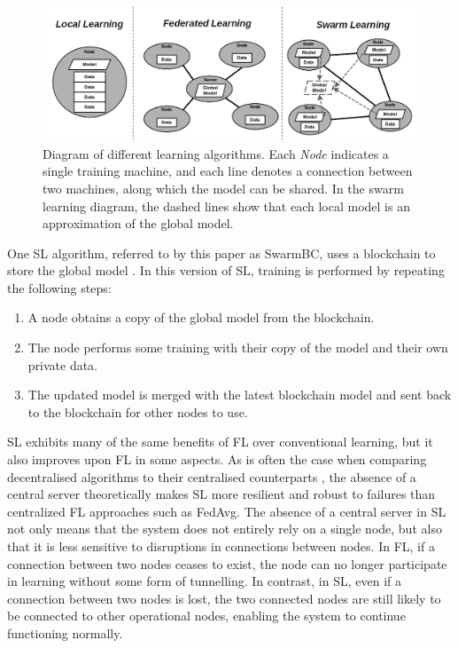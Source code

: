 \documentclass[letterpaper, 10 pt, conference]{ieeeconf}  %
\begin{document}
\begin{figure}[h]
	\includegraphics[width=\linewidth]{fedvsswarm}
	\caption{Diagram of different learning algorithms. Each \emph{Node} indicates a single training machine, and each line denotes a connection between two machines, along which the model can be shared. In the swarm learning diagram, the dashed lines show that each local model is an approximation of the global model.} \label{fig_learning}
\end{figure}

One SL algorithm, referred to by this paper as SwarmBC, uses a blockchain to store the global model \cite{swarm_learning}. In this version of SL, training is performed by repeating the following steps:
\begin{enumerate}
	\item A node obtains a copy of the global model from the blockchain.
	\item The node performs some training with their copy of the model and their own private data.
	\item The updated model is merged with the latest blockchain model and sent back to the blockchain for other nodes to use.
\end{enumerate}

SL exhibits many of the same benefits of FL over conventional learning, but it also improves upon FL in some aspects. As is often the case when comparing decentralised algorithms to their centralised counterparts \cite{swarm_resil}, the absence of a central server theoretically makes SL more resilient and robust to failures than centralized FL approaches such as FedAvg. The absence of a central server in SL not only means that the system does not entirely rely on a single node, but also that it is less sensitive to disruptions in connections between nodes. In FL, if a connection between two nodes ceases to exist, the node can no longer participate in learning without some form of tunnelling. In contrast, in SL, even if a connection between two nodes is lost, the two connected nodes are still likely to be connected to other operational nodes, enabling the system to continue functioning normally. \\
\end{document}
